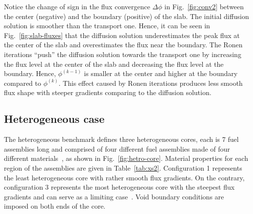 Notice the change of sign in the flux convergence $\Delta \phi$ in Fig.~\ref{fig:conv2} between the center (negative) and the boundary (positive) of the slab. The initial diffusion solution is smoother than the transport one. Hence, it can be seen in Fig.~\ref{fig:slab-fluxes} that the diffusion solution underestimates the peak flux at the center of the slab and overestimates the flux near the boundary. The Ronen iterations ``push'' the diffusion solution towards the transport one by increasing the flux level at the center of the slab and decreasing the flux level at the boundary. Hence, $\phi^{(k-1)}$ is smaller at the center and higher at the boundary compared to $\phi^{(k)}$. This effect caused by Ronen iterations produces less smooth flux shape with steeper gradients comparing to the diffusion solution.
%
\subsection{Heterogeneous case}
\label{subsec:heterog}

The heterogeneous benchmark defines three heterogeneous cores, each is 7 fuel assemblies long and comprised of four different fuel assemblies made of four different materials~\cite{Rahnema-1997}, as shown in Fig.~\ref{fig:hetro-core}. Material properties for each region of the assemblies are given in Table~\ref{tab:xs2}. Configuration 1 represents the least heterogeneous core with rather smooth flux gradients. On the contrary, configuration 3 represents the most heterogeneous core with the steepest flux gradients and can serve as a limiting case~\cite{Rahnema-1997}. Void boundary conditions are imposed on both ends of the core. 

